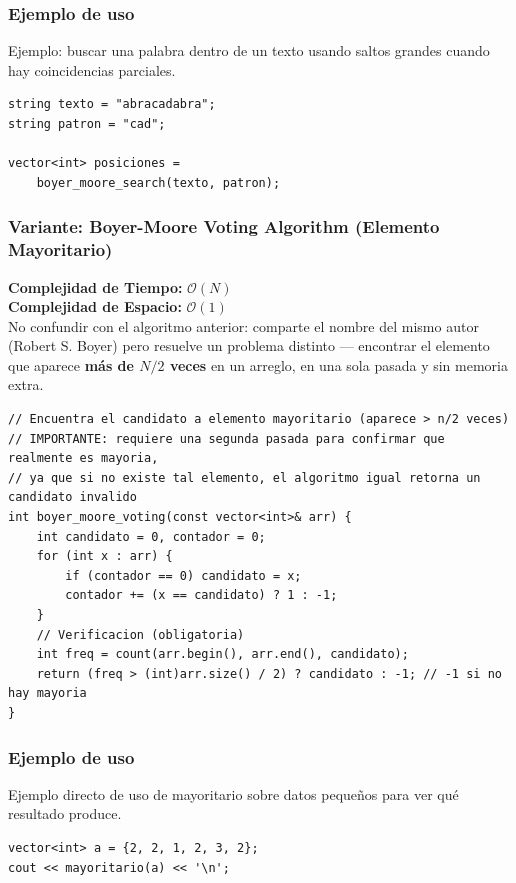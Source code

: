 \documentclass[10pt,twocolumn,letterpaper]{report}
\begin{document}
\subsubsection*{Ejemplo de uso}
Ejemplo: buscar una palabra dentro de un texto usando saltos grandes cuando hay coincidencias parciales.
\begin{lstlisting}
string texto = "abracadabra";
string patron = "cad";

vector<int> posiciones =
    boyer_moore_search(texto, patron);
\end{lstlisting}

\subsubsection{Variante: Boyer-Moore Voting Algorithm (Elemento Mayoritario)}
\textbf{Complejidad de Tiempo:} $\mathcal{O}(N)$ \\
\textbf{Complejidad de Espacio:} $\mathcal{O}(1)$ \\
No confundir con el algoritmo anterior: comparte el nombre del mismo autor (Robert S. Boyer) pero resuelve un problema distinto — encontrar el elemento que aparece \textbf{más de $N/2$ veces} en un arreglo, en una sola pasada y sin memoria extra.
\begin{lstlisting}
// Encuentra el candidato a elemento mayoritario (aparece > n/2 veces)
// IMPORTANTE: requiere una segunda pasada para confirmar que realmente es mayoria,
// ya que si no existe tal elemento, el algoritmo igual retorna un candidato invalido
int boyer_moore_voting(const vector<int>& arr) {
    int candidato = 0, contador = 0;
    for (int x : arr) {
        if (contador == 0) candidato = x;
        contador += (x == candidato) ? 1 : -1;
    }
    // Verificacion (obligatoria)
    int freq = count(arr.begin(), arr.end(), candidato);
    return (freq > (int)arr.size() / 2) ? candidato : -1; // -1 si no hay mayoria
}
\end{lstlisting}
\subsubsection*{Ejemplo de uso}
Ejemplo directo de uso de mayoritario sobre datos pequeños para ver qué resultado produce.
\begin{lstlisting}
vector<int> a = {2, 2, 1, 2, 3, 2};
cout << mayoritario(a) << '\n';
\end{lstlisting}

\end{document}
